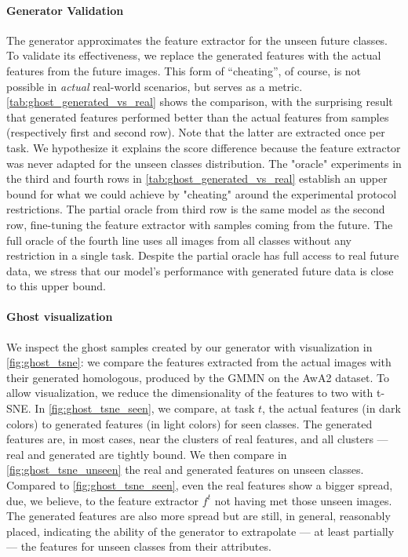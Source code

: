 \paragraph{Generator Validation} The generator approximates the feature extractor for the unseen
future classes. To validate its effectiveness, we replace the generated features with the actual
features from the future images. This form of “cheating”, of course, is not possible in
\textit{actual} real-world scenarios, but serves as a metric. \autoref{tab:ghost_generated_vs_real}
shows the comparison, with the surprising result that generated features performed better than the
actual features from samples (respectively first and second row). Note that the latter are extracted
once per task. We hypothesize it explains the score difference because the feature extractor was
never adapted for the unseen classes distribution. The "oracle" experiments in the third and fourth
rows in \autoref{tab:ghost_generated_vs_real} establish an upper bound for what we could achieve by
"cheating" around the experimental protocol restrictions. The partial oracle from third row is the
same model as the second row, fine-tuning the feature extractor with samples coming from the future.
The full oracle of the fourth line uses all images from all classes without any restriction in a
single task. Despite the partial oracle has full access to real future data, we stress that our
model's performance with generated future data is close to this upper bound.




\paragraph{Ghost visualization} We inspect the ghost samples created by our generator with
visualization in \autoref{fig:ghost_tsne}: we compare the features extracted from the actual images
with their generated homologous, produced by the GMMN on the AwA2 dataset. To allow visualization,
we reduce the dimensionality of the features to two with t-SNE. In \autoref{fig:ghost_tsne_seen}, we
compare, at task $t$, the actual features (in dark colors) to generated features (in light colors)
for seen classes. The generated features are, in most cases, near the clusters of real features, and
all clusters — real and generated are tightly bound. We then compare in
\autoref{fig:ghost_tsne_unseen} the real and generated features on unseen classes. Compared to
\autoref{fig:ghost_tsne_seen}, even the real features show a bigger spread, due, we believe, to the
feature extractor $f^t$ not having met those unseen images. The generated features are also more
spread but are still, in general, reasonably placed, indicating the ability of the generator to
extrapolate — at least partially — the features for unseen classes from their attributes.

